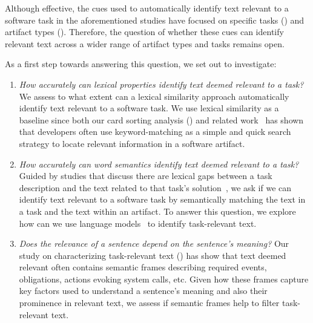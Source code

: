 Although effective, the cues used to automatically identify text relevant to a software task in the aforementioned studies have focused on specific tasks () and artifact types ().
Therefore, the question of whether these cues can identify relevant text across a wider range of artifact types and tasks remains open. 



As a first step towards answering this question, we set out to investigate:


\begin{enumerate}
    \item \textit{How accurately can lexical properties identify text deemed relevant to a task?}
    We assess to what extent can a lexical similarity approach automatically identify text relevant to a software task.
    We use lexical similarity as a baseline since both our card sorting analysis () and related work~\cite{Ko2006a, Freund2015} has shown
    that developers often use keyword-matching as a simple and quick search strategy to locate relevant information in a software artifact.


    \item \textit{How accurately can word semantics identify text deemed relevant to a task?}
    Guided by studies that discuss there are lexical gaps between a task description and the text related to that task's solution~\cite{silva2019, Huang2018, Ye2016},
    we ask if we can identify text relevant to a software task by semantically matching the text in a task and the text within an artifact.
    To answer this question, we explore how can we use language models~\cite{Devlin2018Bert, Mikolov2013} to identify  task-relevant text.

    
    \item \textit{Does the relevance of a sentence depend on the sentence's meaning?}
    Our study on characterizing task-relevant text () has show that text deemed relevant often contains semantic frames describing 
     required events, obligations, actions evoking system calls, etc.
    Given how these frames capture key factors used to understand a sentence's meaning
    and also their prominence in relevant text, 
    we assess if semantic frames help to filter task-relevant text.
\end{enumerate}





